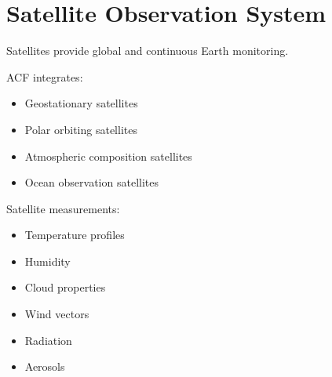 \section{Satellite Observation System}


Satellites provide global and continuous Earth monitoring.



ACF integrates:


\begin{itemize}

\item Geostationary satellites

\item Polar orbiting satellites

\item Atmospheric composition satellites

\item Ocean observation satellites

\end{itemize}



Satellite measurements:


\begin{itemize}

\item Temperature profiles

\item Humidity

\item Cloud properties

\item Wind vectors

\item Radiation

\item Aerosols

\end{itemize}

